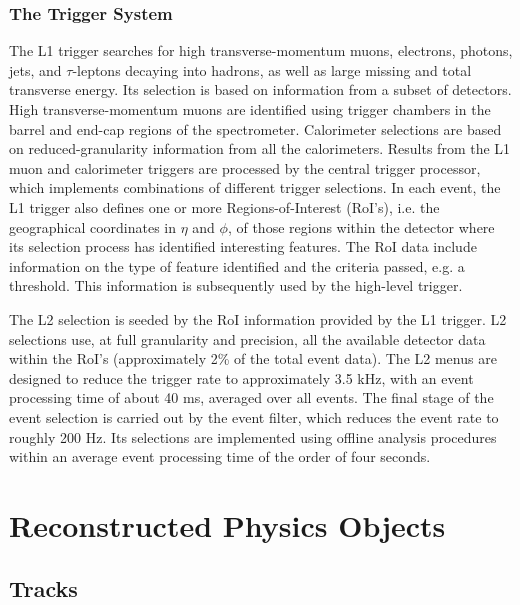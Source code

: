 \subsubsection{The Trigger System}

The L1 trigger searches for high transverse-momentum muons, electrons, photons, jets, and $\tau$-leptons decaying into hadrons, as well as large missing and total transverse energy. Its selection is based on information from a subset of detectors. High transverse-momentum muons are identified using trigger chambers in the barrel and end-cap regions of the spectrometer. Calorimeter selections are based on reduced-granularity information from all the calorimeters. Results from the L1 muon and calorimeter triggers are processed by the central trigger processor, which implements combinations of different trigger selections. In each event, the L1 trigger also defines one or more Regions-of-Interest (RoI’s), i.e. the geographical coordinates in $\eta$ and $\phi$, of those regions within the detector where its selection process has identified interesting features. The RoI data include information on the type of feature identified and the criteria passed, e.g. a threshold. This information is subsequently used by the high-level trigger.

The L2 selection is seeded by the RoI information provided by the L1 trigger. L2 selections use, at full granularity and precision, all the available detector data within the RoI’s (approximately 2\% of the total event data). The L2 menus are designed to reduce the trigger rate to approximately 3.5 kHz, with an event processing time of about 40 ms, averaged over all events. The final stage of the event selection is carried out by the event filter, which reduces the event rate to roughly 200 Hz. Its selections are implemented using offline analysis procedures within an average event processing time of the order of four seconds.








\section{Reconstructed Physics Objects}\label{sec:physics-objects}

\subsection{Tracks}\label{sec:tracks}

